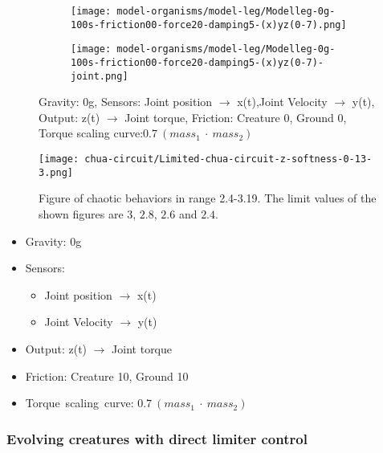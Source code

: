 \documentclass[main]{subfiles}
\begin{document}
\begin{figure}[H]
	\centering
		\begin{subfigure}[c]{0.45\textwidth}
	\texttt{[image: model-organisms/model-leg/Modelleg-0g-100s-friction00-force20-damping5-(x)yz(0-7).png]}
		\end{subfigure}
	\begin{subfigure}[c]{0.45\textwidth}
	\texttt{[image: model-organisms/model-leg/Modelleg-0g-100s-friction00-force20-damping5-(x)yz(0-7)-joint.png]}
		\end{subfigure}
	\caption[Figure of chaotic behaviors in range 2.4-3.19]{Gravity: 0g, Sensors:  Joint position \(\rightarrow\) x(t),Joint Velocity \(\rightarrow\) y(t), Output: z(t) \(\rightarrow\) Joint torque, Friction: Creature 0, Ground 0, Torque scaling curve:\(0.7~(mass_1~\cdot~mass_2)\)}

	\label{figure:z-2.4-3.19-chaotictrajectories}
\end{figure}

\begin{minipage}{\textwidth}
\begin{minipage}{0.5\textwidth}

   \begin{figure}[H]
	\centering
	\texttt{[image: chua-circuit/Limited-chua-circuit-z-softness-0-13-3.png]}
	\caption[Figure of chaotic behaviors in range 2.4-3.19]{Figure of chaotic behaviors in range 2.4-3.19. The limit values of the shown figures are \(3\), \(2.8\), \(2.6\) and \(2.4\).}
	\label{figure:z-2.4-3.19-chaotictrajectories}
	\end{figure}
	
\end{minipage}\hfill
\begin{minipage}{0.5\textwidth}
	\scriptsize
   \begin{itemize}
		\item Gravity: 0g
		\item Sensors: 
		\begin{itemize}
			\item Joint position \(\rightarrow\) x(t)
			\item Joint Velocity \(\rightarrow\) y(t)
		\end{itemize}
		\item Output: z(t) \(\rightarrow\) Joint torque
		\item Friction: Creature 10, Ground 10
		\item \mbox{Torque scaling curve:} \(0.7~(mass_1~\cdot~mass_2)\)
	\end{itemize}
	\normalsize
	
\end{minipage}%
\end{minipage}


\subsubsection{Evolving creatures with direct limiter control}


\end{document}
